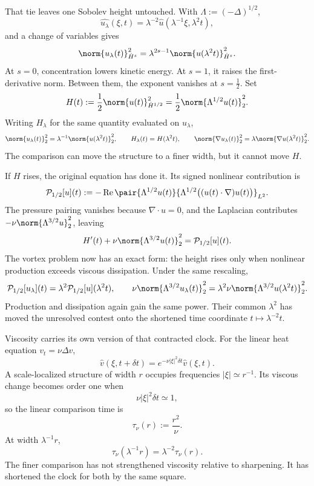 
That tie leaves one Sobolev height untouched.
With \(\Lambda:=(-\Delta)^{1/2}\),
\[
  \widehat{u_\lambda}(\xi,t)
  =
  \lambda^{-2}\widehat u(\lambda^{-1}\xi,\lambda^2t),
\]
and a change of variables gives
\[
  \norm{u_\lambda(t)}_{\dot H^s}^2
  =
  \lambda^{2s-1}
  \norm{u(\lambda^2t)}_{\dot H^s}^2.
\]
At \(s=0\), concentration lowers kinetic energy.
At \(s=1\), it raises the first-derivative norm.
Between them, the exponent vanishes at \(s=\tfrac12\).
Set
\[
  H(t)
  :=
  \frac12\norm{u(t)}_{\dot H^{1/2}}^2
  =
  \frac12\norm{\Lambda^{1/2}u(t)}_2^2.
\]
Writing \(H_\lambda\) for the same quantity evaluated on \(u_\lambda\),
\[
  \norm{u_\lambda(t)}_2^2
  =
  \lambda^{-1}\norm{u(\lambda^2t)}_2^2,
  \qquad
  H_\lambda(t)=H(\lambda^2t),
  \qquad
  \norm{\nabla u_\lambda(t)}_2^2
  =
  \lambda\norm{\nabla u(\lambda^2t)}_2^2.
\]
The comparison can move the structure to a finer width, but it cannot move \(H\).


If \(H\) rises, the original equation has done it.
Its signed nonlinear contribution is
\[
  \mathcal P_{1/2}[u](t)
  :=
  -\operatorname{Re}
  \pair
    {\Lambda^{1/2}u(t)}
    {\Lambda^{1/2}\bigl((u(t)\cdot\nabla)u(t)\bigr)}_{L^2}.
\]
The pressure pairing vanishes because \(\nabla\cdot u=0\), and the Laplacian contributes \(-\nu\norm{\Lambda^{3/2}u}_2^2\), leaving
\[
  H'(t)
  +
  \nu\norm{\Lambda^{3/2}u(t)}_2^2
  =
  \mathcal P_{1/2}[u](t).
\]
The vortex problem now has an exact form: the height rises only when nonlinear production exceeds viscous dissipation.
Under the same rescaling,
\[
  \mathcal P_{1/2}[u_\lambda](t)
  =
  \lambda^2\mathcal P_{1/2}[u](\lambda^2t),
  \qquad
  \nu\norm{\Lambda^{3/2}u_\lambda(t)}_2^2
  =
  \lambda^2\nu\norm{\Lambda^{3/2}u(\lambda^2t)}_2^2.
\]
Production and dissipation again gain the same power.
Their common \(\lambda^2\) has moved the unresolved contest onto the shortened time coordinate \(t\mapsto\lambda^{-2}t\).


Viscosity carries its own version of that contracted clock.
For the linear heat equation \(v_t=\nu\Delta v\),
\[
  \widehat v(\xi,t+\delta t)
  =
  e^{-\nu|\xi|^2\delta t}\widehat v(\xi,t).
\]
A scale-localized structure of width \(r\) occupies frequencies \(|\xi|\simeq r^{-1}\).
Its viscous change becomes order one when
\[
  \nu|\xi|^2\delta t\simeq1,
\]
so the linear comparison time is
\[
  \tau_\nu(r)
  :=
  \frac{r^2}{\nu}.
\]
At width \(\lambda^{-1}r\),
\[
  \tau_\nu(\lambda^{-1}r)
  =
  \lambda^{-2}\tau_\nu(r).
\]
The finer comparison has not strengthened viscosity relative to sharpening.
It has shortened the clock for both by the same square.

